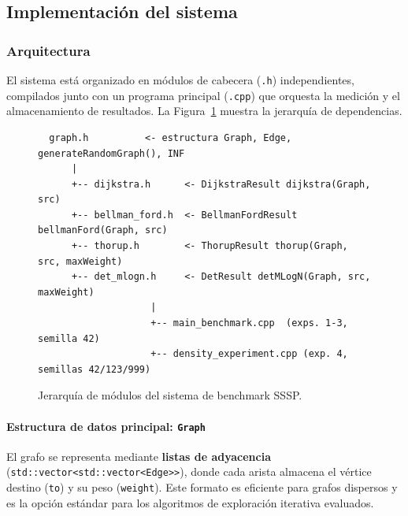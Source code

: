
\subsection{Implementación del sistema}

\subsubsection{Arquitectura}

El sistema está organizado en módulos de cabecera (\texttt{.h}) independientes,
compilados junto con un programa principal (\texttt{.cpp}) que orquesta la
medición y el almacenamiento de resultados.
La Figura~\ref{fig:arquitectura} muestra la jerarquía de dependencias.

\begin{figure}[t]
  \centering
  \begin{minipage}{0.85\linewidth}
  \footnotesize
  \begin{verbatim}
  graph.h          <- estructura Graph, Edge, generateRandomGraph(), INF
      |
      +-- dijkstra.h      <- DijkstraResult dijkstra(Graph, src)
      +-- bellman_ford.h  <- BellmanFordResult bellmanFord(Graph, src)
      +-- thorup.h        <- ThorupResult thorup(Graph, src, maxWeight)
      +-- det_mlogn.h     <- DetResult detMLogN(Graph, src, maxWeight)
                    |
                    +-- main_benchmark.cpp  (exps. 1-3, semilla 42)
                    +-- density_experiment.cpp (exp. 4, semillas 42/123/999)
  \end{verbatim}
  \end{minipage}
  \caption{Jerarquía de módulos del sistema de benchmark SSSP.}
  \label{fig:arquitectura}
\end{figure}

\paragraph{Estructura de datos principal: \texttt{Graph}}
El grafo se representa mediante \textbf{listas de adyacencia}
(\texttt{std::vector<std::vector<Edge>{}>}), donde cada arista almacena el
vértice destino (\texttt{to}) y su peso (\texttt{weight}).
Este formato es eficiente para grafos dispersos y es la opción estándar para
los algoritmos de exploración iterativa evaluados.

